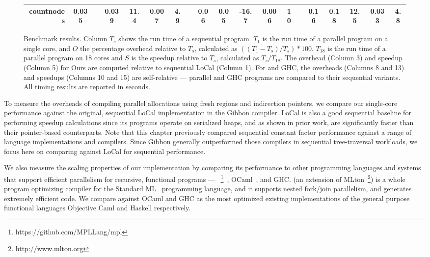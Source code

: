 \documentclass[showabstract,showacknowledgments,showpreface,showdedication,school]{iuphd}
\theoremstyle{nonumberplain}
\newcommand{\sysname}[0]{LoCal\xspace}
\newcommand{\ourcalc}[0]{\sysname}
\newcommand{\MPL}{\text{MaPLe}}
\begin{document}
\begin{figure}
\begin{tabular}{@{}r cc cccc r ccccc r ccccc@{}}
    countnodes & 0.035 && 0.039 & 11.4 & 0.007 & 4.9 && 0.06 & 0.05 & -16.7 & 0.006 & 10 && 0.16 & 0.18 & 12.5 & 0.033 & 4.8 \\

    \bottomrule
  \end{tabular}
  \vspace{2mm}
  \normalsize
  \caption{
    Benchmark results.
    Column $T_s$ shows the run time of a sequential program.
    $T_1$ is the run time of a parallel program on a single core, and
    $O$ the percentage overhead relative to $T_s$, calculated as
    $((T_1 - T_s) / T_s) * 100$.
    $T_{18}$ is the run time of a parallel program on 18 cores and
    $S$ is the speedup relative to $T_s$, calculated as $T_s / T_{18}$.
    The overhead (Column 3) and speedup (Column 5) for Ours are
    computed relative to sequential LoCal (Column 1).
    For \MPL{} and GHC, the overheads (Columns 8 and 13) and speedups (Columns 10 and 15)
    are self-relative ---
    parallel \MPL{} and GHC programs are compared to their sequential variants.
    All timing results are reported in seconds.
  }
  \label{fig:benchmark-results}
\end{figure}

To measure the overheads of compiling parallel allocations using
fresh regions and indirection pointers, we compare our single-core performance
against the original, sequential \ourcalc{} implementation in the Gibbon compiler.
\ourcalc{} is also a good sequential baseline for performing speedup calculations
since its programs operate on serialized heaps, and
as shown in prior work, are significantly faster than their pointer-based counterparts.
Note that this chapter previously compared sequential constant factor performance
against a range of language implementations and compilers.
Since Gibbon generally
outperformed those compilers in sequential tree-traversal workloads, we focus
here on comparing against \ourcalc{} for sequential performance.

We also measure the scaling properties of our implementation by comparing its
performance to other programming languages and systems
that support efficient parallelism for recursive, functional programs
--- \MPL{}~\footnote{https://github.com/MPLLang/mpl}~\cite{MPL},
OCaml~\cite{OCaml}, and GHC.
\MPL{} (an extension of MLton~\footnote{http://www.mlton.org})
is a whole program optimizing compiler for the Standard ML~\cite{StandardML}
programming language,
and it supports nested fork/join parallelism, and generates extremely efficient code.
We compare against OCaml and GHC as the most optimized existing implementations of the
general purpose functional languages Objective Caml and Haskell respectively.
\end{document}
